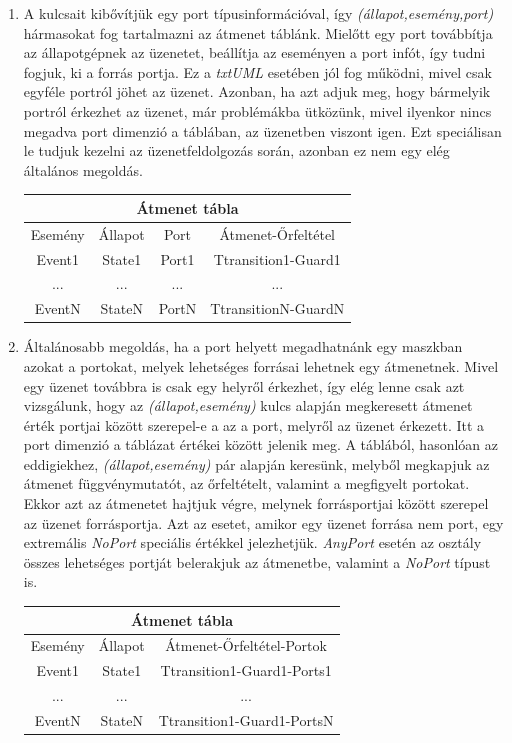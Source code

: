 \documentclass[a4paper,12pt]{report}
\begin{document}
\begin{enumerate}
\item A kulcsait kibővítjük egy port típusinformációval, így \textit{(állapot,esemény,port)} hármasokat fog tartalmazni az átmenet táblánk. Mielőtt egy port továbbítja az állapotgépnek az üzenetet, beállítja az eseményen a port infót, így tudni fogjuk, ki a forrás portja. Ez a \textit{txtUML} esetében jól fog működni, mivel csak egyféle portról jöhet az üzenet. Azonban, ha azt adjuk meg, hogy bármelyik portról érkezhet az üzenet, már problémákba ütközünk, mivel ilyenkor nincs megadva port dimenzió a táblában, az üzenetben viszont igen. Ezt speciálisan le tudjuk kezelni az üzenetfeldolgozás során, azonban ez nem egy elég általános megoldás. \\

\begin{center}
\begin{tabular}{@{}ccc|c@{}} \toprule
\multicolumn{4}{c}{Átmenet tábla} \\\midrule
Esemény & Állapot 	& Port 	& Átmenet-Őrfeltétel\\\midrule
Event1 	& State1 	& Port1 & Ttransition1-Guard1 \\
... 	& ... 		& ... 	& ... \\
EventN 	& StateN 	& PortN & TtransitionN-GuardN
\end{tabular}
\small
\end{center}
\item Általánosabb megoldás, ha a port helyett megadhatnánk egy maszkban azokat a portokat, melyek lehetséges forrásai lehetnek egy átmenetnek. Mivel egy üzenet továbbra is csak egy helyről érkezhet, így elég lenne csak azt vizsgálunk, hogy az \textit{(állapot,esemény)} kulcs alapján megkeresett átmenet érték portjai között szerepel-e a az a port, melyről az üzenet érkezett. Itt a port dimenzió a táblázat értékei között jelenik meg. A táblából, hasonlóan az eddigiekhez, \textit{(állapot,esemény)} pár alapján keresünk, melyből megkapjuk az átmenet függvénymutatót, az őrfeltételt, valamint a megfigyelt portokat. Ekkor azt az átmenetet hajtjuk végre, melynek forrásportjai között szerepel az üzenet forrásportja. Azt az esetet, amikor egy üzenet forrása nem port, egy extremális \textit{NoPort} speciális értékkel jelezhetjük. \textit{AnyPort} esetén az osztály összes lehetséges portját belerakjuk az átmenetbe, valamint a \textit{NoPort} típust is. \\

\begin{center}
\begin{tabular}{@{}cc|c@{}} \toprule
\multicolumn{3}{c}{Átmenet tábla} \\\midrule
Esemény & Állapot 	&  Átmenet-Őrfeltétel-Portok\\\midrule
Event1 	& State1 	&  Ttransition1-Guard1-Ports1 \\
... 	& ... 	 	& ... \\
EventN 	& StateN 	& Ttransition1-Guard1-PortsN
\end{tabular}
\small
\end{center}
\end{enumerate}
\end{document}
